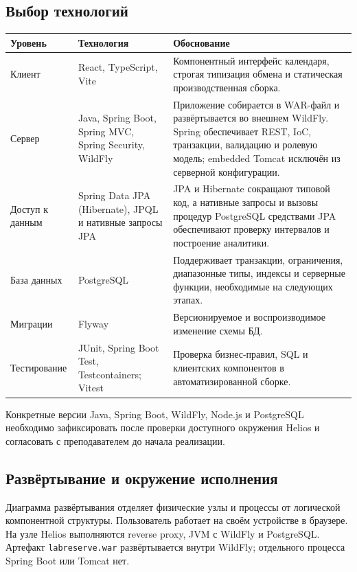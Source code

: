 \documentclass[12pt,a4paper]{article}
\begin{document}
\subsection{Выбор технологий}

\begin{longtable}{|p{}|p{}|p{}|}
\hline
\textbf{Уровень} & \textbf{Технология} & \textbf{Обоснование} \\
\hline
Клиент & React, TypeScript, Vite & Компонентный интерфейс календаря, строгая
типизация обмена и статическая производственная сборка. \\
\hline
Сервер & Java, Spring Boot, Spring MVC, Spring Security, WildFly &
Приложение собирается в WAR-файл и развёртывается во внешнем WildFly. Spring
обеспечивает REST, IoC, транзакции, валидацию и ролевую модель; embedded Tomcat
исключён из серверной конфигурации. \\
\hline
Доступ к данным & Spring Data JPA (Hibernate), JPQL и нативные запросы JPA &
JPA и Hibernate сокращают типовой код, а нативные запросы и вызовы процедур
PostgreSQL средствами JPA обеспечивают проверку интервалов и построение аналитики. \\
\hline
База данных & PostgreSQL & Поддерживает транзакции, ограничения, диапазонные
типы, индексы и серверные функции, необходимые на следующих этапах. \\
\hline
Миграции & Flyway & Версионируемое и воспроизводимое изменение схемы БД. \\
\hline
Тестирование & JUnit, Spring Boot Test, Testcontainers; Vitest & Проверка
бизнес-правил, SQL и клиентских компонентов в автоматизированной сборке. \\
\hline
\end{longtable}

Конкретные версии Java, Spring Boot, WildFly, Node.js и PostgreSQL необходимо
зафиксировать после проверки доступного окружения Helios и согласовать с
преподавателем до начала реализации.

\subsection{Развёртывание и окружение исполнения}

Диаграмма развёртывания отделяет физические узлы и процессы от логической
компонентной структуры. Пользователь работает на своём устройстве в браузере.
На узле Helios выполняются reverse proxy, JVM с WildFly и PostgreSQL. Артефакт
\texttt{labreserve.war} развёртывается внутри WildFly; отдельного процесса
Spring Boot или Tomcat нет.
\end{document}
